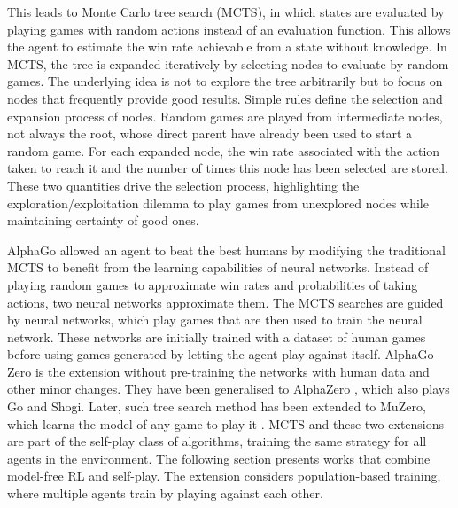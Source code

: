 This leads to Monte Carlo tree search (MCTS), in which states are evaluated by playing games with random actions instead of an evaluation function.
This allows the agent to estimate the win rate achievable from a state without knowledge.
In MCTS, the tree is expanded iteratively by selecting nodes to evaluate by random games.
The underlying idea is not to explore the tree arbitrarily but to focus on nodes that frequently provide good results.
Simple rules define the selection and expansion process of nodes.
Random games are played from intermediate nodes, not always the root, whose direct parent have already been used to start a random game.
For each expanded node, the win rate associated with the action taken to reach it and the number of times this node has been selected are stored.
These two quantities drive the selection process, highlighting the exploration/exploitation dilemma to play games from unexplored nodes while maintaining certainty of good ones.

AlphaGo \citep{silver2016mastering} allowed an agent to beat the best humans by modifying the traditional MCTS to benefit from the learning capabilities of neural networks.
Instead of playing random games to approximate win rates and probabilities of taking actions, two neural networks approximate them.
The MCTS searches are guided by neural networks, which play games that are then used to train the neural network.
These networks are initially trained with a dataset of human games before using games generated by letting the agent play against itself.
AlphaGo Zero \citep{silver2017mastering} is the extension without pre-training the networks with human data and other minor changes.
They have been generalised to AlphaZero \citep{silver2018general}, which also plays Go and Shogi.
Later, such tree search method has been extended to MuZero, which learns the model of any game to play it  \citep{schrittwieser2020mastering}.
MCTS and these two extensions are part of the self-play class of algorithms, training the same strategy for all agents in the environment.
The following section presents works that combine model-free RL and self-play.
The extension considers population-based training, where multiple agents train by playing against each other.

